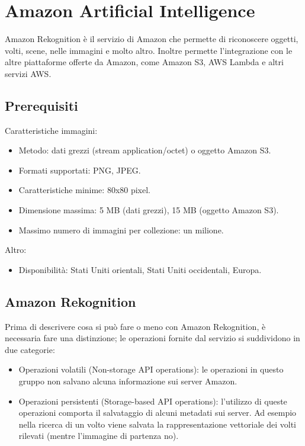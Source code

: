 
\section{Amazon Artificial Intelligence}
Amazon Rekognition \cite{amazon-api} è il servizio di Amazon che permette di riconoscere oggetti, volti, scene, nelle immagini e molto altro.
Inoltre permette l'integrazione con le altre piattaforme offerte da Amazon, come Amazon S3, AWS Lambda e altri servizi AWS.

\subsection{Prerequisiti}
Caratteristiche immagini:
\begin{itemize}
\item Metodo: dati grezzi (stream application/octet) o oggetto Amazon S3.
\item Formati supportati: PNG, JPEG.
\item Caratteristiche minime: 80x80 pixel.
\item Dimensione massima: 5 MB (dati grezzi), 15 MB (oggetto Amazon S3).
\item Massimo numero di immagini per collezione: un milione.
\end{itemize}
Altro:
\begin{itemize}
\item Disponibilità: Stati Uniti orientali, Stati Uniti occidentali, Europa.
\end{itemize}

\subsection{Amazon Rekognition}
Prima di descrivere cosa si può fare o meno con Amazon Rekognition, è necessaria fare una distinzione; le operazioni fornite dal servizio si suddividono in due categorie:
\begin{itemize}
\item Operazioni volatili (Non-storage API operations): le operazioni in questo gruppo non salvano alcuna informazione sui server Amazon.
\item Operazioni persistenti (Storage-based API operations): l'utilizzo di queste operazioni comporta il salvataggio di alcuni metadati sui server.
Ad esempio nella ricerca di un volto viene salvata la rappresentazione vettoriale dei volti rilevati (mentre l'immagine di partenza no).
\end{itemize}

